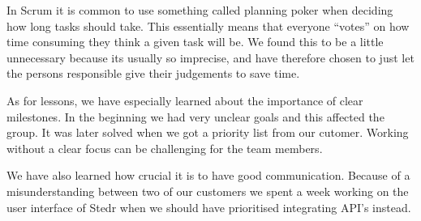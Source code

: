 In Scrum it is common to use something called planning poker when deciding how long tasks should take. This essentially means that everyone “votes” on how time consuming they think a given task will be. We found this to be a little unnecessary because its usually so imprecise, and have therefore chosen to just let the persons responsible give their judgements to save time. 

As for lessons, we have especially learned about the importance of clear milestones. In the beginning we had very unclear goals and this affected the group. It was later solved when we got a priority list from our cutomer. Working without a clear focus can be challenging for the team members.

We have also learned how crucial it is to have good communication. Because of a misunderstanding between two of our customers we spent a week working on the user interface of Stedr when we should have prioritised integrating API’s instead.